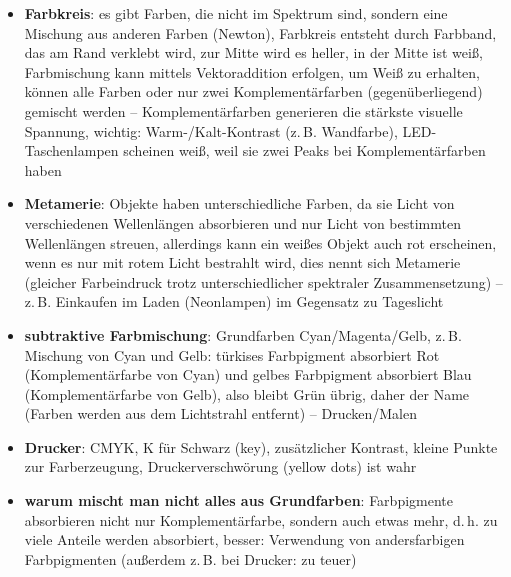 \begin{itemize}
    \item
    \textbf{Farbkreis}:
    es gibt Farben, die nicht im Spektrum sind, sondern eine Mischung aus
    anderen Farben (Newton),
    Farbkreis entsteht durch Farbband, das am Rand verklebt wird,
    zur Mitte wird es heller, in der Mitte ist weiß,
    Farbmischung kann mittels Vektoraddition erfolgen,
    um Weiß zu erhalten, können alle Farben oder nur zwei Komplementärfarben
    (gegenüberliegend) gemischt werden --
    Komplementärfarben generieren die stärkste visuelle Spannung,
    wichtig: Warm-/Kalt-Kontrast (z.\,B. Wandfarbe),
    LED-Taschenlampen scheinen weiß, weil sie zwei Peaks bei
    Komplementärfarben haben

    \item
    \textbf{Metamerie}:
    Objekte haben unterschiedliche Farben, da sie Licht von verschiedenen
    Wellenlängen absorbieren und nur Licht von bestimmten Wellenlängen streuen,
    allerdings kann ein weißes Objekt auch rot erscheinen, wenn es nur
    mit rotem Licht bestrahlt wird, dies nennt sich Metamerie
    (gleicher Farbeindruck trotz unterschiedlicher spektraler
    Zusammensetzung) -- z.\,B. Einkaufen im Laden (Neonlampen) im Gegensatz zu
    Tageslicht
\end{itemize}
\linie
\begin{itemize}
    \item
    \textbf{subtraktive Farbmischung}:
    Grundfarben Cyan/Magenta/Gelb, z.\,B. Mischung von Cyan und Gelb:
    türkises Farbpigment absorbiert Rot (Komplementärfarbe von Cyan) und
    gelbes Farbpigment absorbiert Blau (Komplementärfarbe von Gelb), also
    bleibt Grün übrig, daher der Name
    (Farben werden aus dem Lichtstrahl entfernt) --
    Drucken/Malen

    \item
    \textbf{Drucker}: CMYK, K für Schwarz (key), zusätzlicher Kontrast,
    kleine Punkte zur Farberzeugung,
    Druckerverschwörung (yellow dots) ist wahr

    \item
    \textbf{warum mischt man nicht alles aus Grundfarben}:
    Farbpigmente absorbieren nicht nur Komplementärfarbe, sondern auch
    etwas mehr, d.\,h. zu viele Anteile werden absorbiert, besser:
    Verwendung von andersfarbigen Farbpigmenten
    (außerdem z.\,B. bei Drucker: zu teuer)
\end{itemize}
\linie

